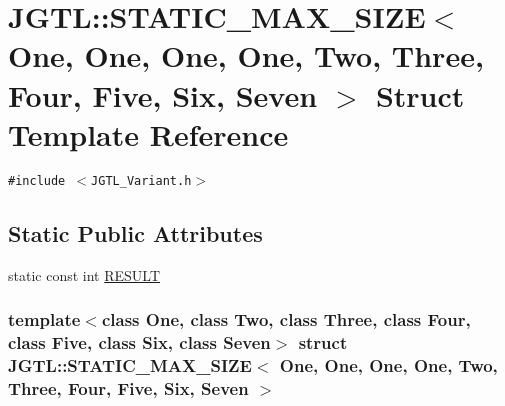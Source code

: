 \hypertarget{struct_j_g_t_l_1_1_s_t_a_t_i_c___m_a_x___s_i_z_e_3_01_one_00_01_one_00_01_one_00_01_one_00_01_tw5a2eea924c533f564bf1050b20ef91fc}{
\section{JGTL::STATIC\_\-MAX\_\-SIZE$<$ One, One, One, One, Two, Three, Four, Five, Six, Seven $>$ Struct Template Reference}
\label{struct_j_g_t_l_1_1_s_t_a_t_i_c___m_a_x___s_i_z_e_3_01_one_00_01_one_00_01_one_00_01_one_00_01_tw5a2eea924c533f564bf1050b20ef91fc}
}
{\tt \#include $<$JGTL\_\-Variant.h$>$}

\subsection*{Static Public Attributes}
\begin{CompactItemize}
\item 
static const int \hyperlink{struct_j_g_t_l_1_1_s_t_a_t_i_c___m_a_x___s_i_z_e_3_01_one_00_01_one_00_01_one_00_01_one_00_01_tw5a2eea924c533f564bf1050b20ef91fc_3251caeab0b9ba2e6d92f12729bc8d67}{RESULT}
\end{CompactItemize}
\subsubsection*{template$<$class One, class Two, class Three, class Four, class Five, class Six, class Seven$>$ struct JGTL::STATIC\_\-MAX\_\-SIZE$<$ One, One, One, One, Two, Three, Four, Five, Six, Seven $>$}



